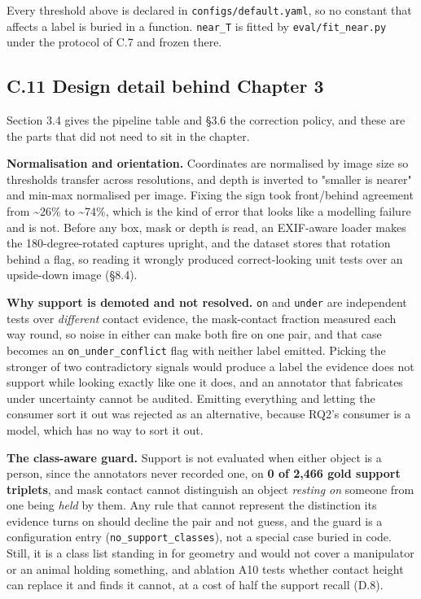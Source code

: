 Every threshold above is declared in \texttt{configs/default.yaml}, so no constant that affects a label is buried in a function. \texttt{near\_\allowbreak{}T} is fitted by \texttt{eval/fit\_\allowbreak{}near.py} under the protocol of C.7 and frozen there.

\subsection{C.11 Design detail behind Chapter 3}

Section 3.4 gives the pipeline table and \S{}3.6 the correction policy, and these are the parts that did not need to sit in the chapter.

\textbf{Normalisation and orientation.} Coordinates are normalised by image size so thresholds transfer across resolutions, and depth is inverted to "smaller is nearer" and min-max normalised per image. Fixing the sign took front/behind agreement from \textasciitilde{}26\% to \textasciitilde{}74\%, which is the kind of error that looks like a modelling failure and is not. Before any box, mask or depth is read, an EXIF-aware loader makes the 180-degree-rotated captures upright, and the dataset stores that rotation behind a flag, so reading it wrongly produced correct-looking unit tests over an upside-down image (\S{}8.4).

\textbf{Why support is demoted and not resolved.} \texttt{on} and \texttt{under} are independent tests over \textit{different} contact evidence, the mask-contact fraction measured each way round, so noise in either can make both fire on one pair, and that case becomes an \texttt{on\_\allowbreak{}under\_\allowbreak{}conflict} flag with neither label emitted. Picking the stronger of two contradictory signals would produce a label the evidence does not support while looking exactly like one it does, and an annotator that fabricates under uncertainty cannot be audited. Emitting everything and letting the consumer sort it out was rejected as an alternative, because RQ2's consumer is a model, which has no way to sort it out.

\textbf{The class-aware guard.} Support is not evaluated when either object is a person, since the annotators never recorded one, on \textbf{0 of 2,466 gold support triplets}, and mask contact cannot distinguish an object \textit{resting on} someone from one being \textit{held} by them. Any rule that cannot represent the distinction its evidence turns on should decline the pair and not guess, and the guard is a configuration entry (\texttt{no\_\allowbreak{}support\_\allowbreak{}classes}), not a special case buried in code. Still, it is a class list standing in for geometry and would not cover a manipulator or an animal holding something, and ablation A10 tests whether contact height can replace it and finds it cannot, at a cost of half the support recall (D.8).

